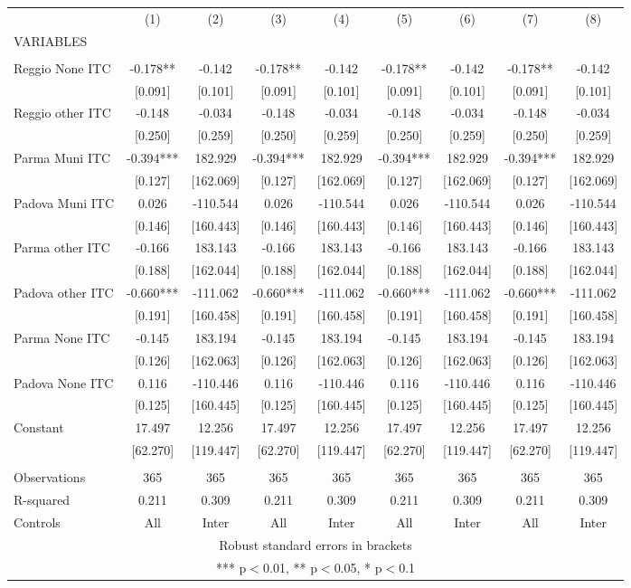 \begin{tabular}{lcccccccc} \hline
 & (1) & (2) & (3) & (4) & (5) & (6) & (7) & (8) \\
VARIABLES &  &  &  &  &  &  &  &  \\ \hline
 &  &  &  &  &  &  &  &  \\
Reggio None ITC & -0.178** & -0.142 & -0.178** & -0.142 & -0.178** & -0.142 & -0.178** & -0.142 \\
 & [0.091] & [0.101] & [0.091] & [0.101] & [0.091] & [0.101] & [0.091] & [0.101] \\
Reggio other ITC & -0.148 & -0.034 & -0.148 & -0.034 & -0.148 & -0.034 & -0.148 & -0.034 \\
 & [0.250] & [0.259] & [0.250] & [0.259] & [0.250] & [0.259] & [0.250] & [0.259] \\
Parma Muni ITC & -0.394*** & 182.929 & -0.394*** & 182.929 & -0.394*** & 182.929 & -0.394*** & 182.929 \\
 & [0.127] & [162.069] & [0.127] & [162.069] & [0.127] & [162.069] & [0.127] & [162.069] \\
Padova Muni ITC & 0.026 & -110.544 & 0.026 & -110.544 & 0.026 & -110.544 & 0.026 & -110.544 \\
 & [0.146] & [160.443] & [0.146] & [160.443] & [0.146] & [160.443] & [0.146] & [160.443] \\
Parma other ITC & -0.166 & 183.143 & -0.166 & 183.143 & -0.166 & 183.143 & -0.166 & 183.143 \\
 & [0.188] & [162.044] & [0.188] & [162.044] & [0.188] & [162.044] & [0.188] & [162.044] \\
Padova other ITC & -0.660*** & -111.062 & -0.660*** & -111.062 & -0.660*** & -111.062 & -0.660*** & -111.062 \\
 & [0.191] & [160.458] & [0.191] & [160.458] & [0.191] & [160.458] & [0.191] & [160.458] \\
Parma None ITC & -0.145 & 183.194 & -0.145 & 183.194 & -0.145 & 183.194 & -0.145 & 183.194 \\
 & [0.126] & [162.063] & [0.126] & [162.063] & [0.126] & [162.063] & [0.126] & [162.063] \\
Padova None ITC & 0.116 & -110.446 & 0.116 & -110.446 & 0.116 & -110.446 & 0.116 & -110.446 \\
 & [0.125] & [160.445] & [0.125] & [160.445] & [0.125] & [160.445] & [0.125] & [160.445] \\
Constant & 17.497 & 12.256 & 17.497 & 12.256 & 17.497 & 12.256 & 17.497 & 12.256 \\
 & [62.270] & [119.447] & [62.270] & [119.447] & [62.270] & [119.447] & [62.270] & [119.447] \\
 &  &  &  &  &  &  &  &  \\
Observations & 365 & 365 & 365 & 365 & 365 & 365 & 365 & 365 \\
R-squared & 0.211 & 0.309 & 0.211 & 0.309 & 0.211 & 0.309 & 0.211 & 0.309 \\
 Controls & All & Inter & All & Inter & All & Inter & All & Inter \\ \hline
\multicolumn{9}{c}{ Robust standard errors in brackets} \\
\multicolumn{9}{c}{ *** p$<$0.01, ** p$<$0.05, * p$<$0.1} \\
\end{tabular}
